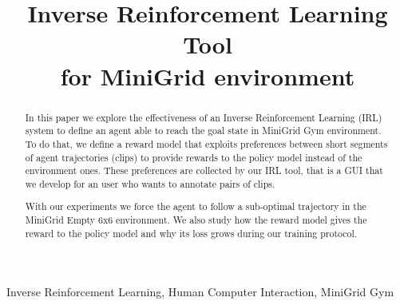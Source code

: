 \documentclass[conference]{IEEEtran}
\begin{document}
\title{Inverse Reinforcement Learning Tool\\for MiniGrid environment
}

\author{
}

\maketitle
\begin{abstract}
In this paper we explore the effectiveness of an Inverse Reinforcement Learning (IRL) system to define an agent able to reach the goal state in MiniGrid Gym environment.
To do that, we define a reward model that exploits preferences between short segments of agent trajectories (clips) to provide rewards to the policy model instead of the environment ones. These preferences are collected by our IRL tool, that is a GUI that we develop for an user who wants to annotate pairs of clips. 

With our experiments we force the agent to follow a sub-optimal trajectory in the MiniGrid Empty 6x6 environment. We also study how the reward model gives the reward to the policy model and why its loss grows during our training protocol. 
\end{abstract}

\begin{IEEEkeywords}
Inverse Reinforcement Learning, Human Computer Interaction, MiniGrid Gym
\end{IEEEkeywords}





      



\end{document}
